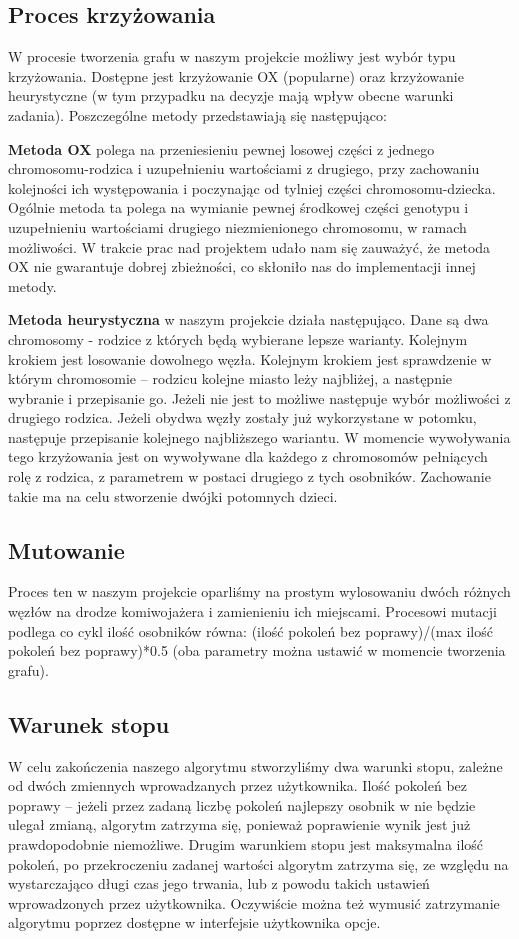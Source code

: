 \documentclass[a4paper]{article}
\begin{document}
\subsection{Proces krzyżowania}
W procesie tworzenia grafu w naszym projekcie możliwy jest wybór typu krzyżowania. Dostępne jest krzyżowanie OX (popularne) oraz krzyżowanie heurystyczne (w tym przypadku na decyzje mają wpływ obecne warunki zadania). Poszczególne metody przedstawiają się następująco:

\textbf{Metoda OX }polega na przeniesieniu pewnej losowej części z jednego chromosomu-rodzica i uzupełnieniu wartościami z drugiego, przy zachowaniu kolejności ich występowania i poczynając od tylniej części chromosomu-dziecka. Ogólnie metoda ta polega na wymianie pewnej środkowej części genotypu i uzupełnieniu wartościami drugiego niezmienionego chromosomu, w ramach możliwości. W trakcie prac nad projektem udało nam się zauważyć, że metoda OX nie gwarantuje dobrej zbieżności, co skłoniło nas do implementacji innej metody.

\textbf{Metoda heurystyczna} w naszym projekcie działa następująco. Dane są dwa chromosomy - rodzice z których będą wybierane lepsze warianty. Kolejnym krokiem jest losowanie dowolnego węzła. Kolejnym krokiem jest sprawdzenie w którym chromosomie – rodzicu kolejne miasto leży najbliżej, a następnie wybranie i przepisanie go. Jeżeli nie jest to możliwe następuje wybór możliwości z drugiego rodzica. Jeżeli obydwa węzły zostały  już wykorzystane w potomku, następuje przepisanie kolejnego najbliższego wariantu. W momencie wywoływania tego krzyżowania jest on wywoływane dla każdego z chromosomów pełniących rolę z rodzica, z parametrem w postaci drugiego z tych osobników. Zachowanie takie ma na celu stworzenie dwójki potomnych dzieci.

\subsection{Mutowanie}
Proces ten w naszym projekcie oparliśmy na prostym wylosowaniu dwóch różnych węzłów na drodze komiwojażera i zamienieniu ich miejscami. Procesowi mutacji podlega co cykl ilość osobników równa: (ilość pokoleń bez poprawy)/(max ilość pokoleń bez poprawy)*0.5 (oba parametry można ustawić w momencie tworzenia grafu).

\subsection{Warunek stopu}
W celu zakończenia naszego algorytmu stworzyliśmy dwa warunki stopu, zależne od dwóch zmiennych wprowadzanych przez użytkownika. Ilość pokoleń bez poprawy – jeżeli przez zadaną liczbę pokoleń najlepszy osobnik w nie będzie ulegał zmianą, algorytm zatrzyma się, ponieważ poprawienie wynik jest już prawdopodobnie niemożliwe. Drugim warunkiem stopu jest maksymalna ilość pokoleń, po przekroczeniu zadanej wartości algorytm zatrzyma się, ze względu na wystarczająco długi czas jego trwania, lub z powodu takich ustawień wprowadzonych przez użytkownika. Oczywiście można też wymusić zatrzymanie algorytmu poprzez dostępne w interfejsie użytkownika opcje.
\end{document}
